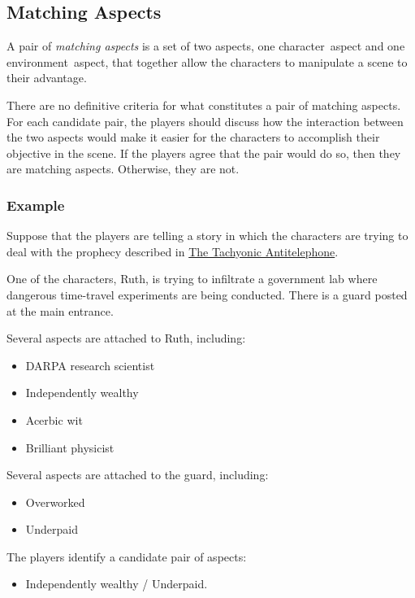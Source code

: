 \documentclass[12pt, a5paper, parskip=half-, footheight=1.4cm]{scrartcl}
\begin{document}
\newpage

\subsection*{Matching Aspects} \label{subsection:matching-aspects}
A pair of \emph{matching aspects} is a set of two aspects, one character~aspect and one environment~aspect, that together allow the characters to manipulate a scene to their advantage.

There are no definitive criteria for what constitutes a pair of matching aspects. 
For each candidate pair, the players should discuss how the interaction between the two aspects would make it easier for the characters to accomplish their objective in the scene. If the players agree that the pair would do so, then they are matching aspects. Otherwise, they are not.

\subsubsection*{Example} \label{example:matching-aspects}
Suppose that the players are telling a story in which the characters are trying to deal with the prophecy described in \hyperref[subsection:the-tachyonic-antitelephone]{\cinzel \small The Tachyonic Antitelephone}. 

One of the characters, Ruth,  is trying to infiltrate a government lab where dangerous time-travel experiments are being conducted.  There is a guard posted at the main entrance.

Several aspects are attached to Ruth, including:\vspace{-1.75ex}
\begin{multicols}{2}
\begin{itemize}[noitemsep,nolistsep,  leftmargin=0.68cm]
  \item DARPA research scientist
  \item Independently wealthy
  \item Acerbic wit
  \item Brilliant physicist
\end{itemize}
\end{multicols}
\vspace{-2ex}
Several aspects are attached to the guard, including:\vspace{-1.75ex}
\begin{multicols}{2}
\begin{itemize}[noitemsep,nolistsep,  leftmargin=0.68cm]
	\item Overworked
	\item Underpaid
\end{itemize}
\end{multicols}
\vspace{-2ex}
The players identify a candidate pair of aspects:
\begin{itemize}[leftmargin=0.68cm, noitemsep,topsep=-1ex]
	\item Independently wealthy / Underpaid.
\end{itemize}
\vspace{1ex}
\end{document}
